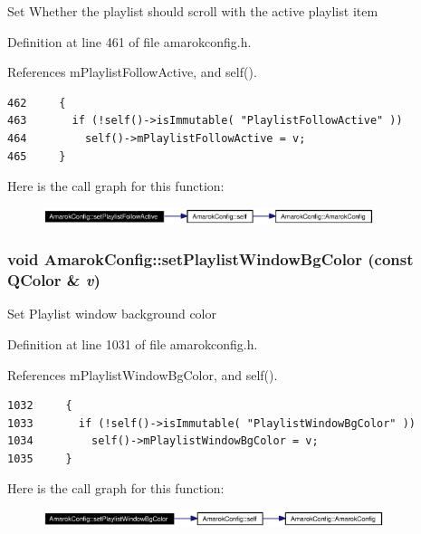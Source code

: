 Set Whether the playlist should scroll with the active playlist item 

Definition at line 461 of file amarokconfig.h.

References m\-Playlist\-Follow\-Active, and self().



\footnotesize\begin{verbatim}462     {
463       if (!self()->isImmutable( "PlaylistFollowActive" ))
464         self()->mPlaylistFollowActive = v;
465     }
\end{verbatim}\normalsize 


Here is the call graph for this function:\begin{figure}[H]
\begin{center}
\leavevmode
\includegraphics[width=274pt]{classAmarokConfig_AmarokConfige47_cgraph}
\end{center}
\end{figure}
\subsubsection{\setlength{\rightskip}{0pt plus 5cm}void Amarok\-Config::set\-Playlist\-Window\-Bg\-Color (const QColor \& {\em v})\hspace{0.3cm}{\tt  [inline, static]}}\label{classAmarokConfig_AmarokConfige107}


Set Playlist window background color 

Definition at line 1031 of file amarokconfig.h.

References m\-Playlist\-Window\-Bg\-Color, and self().



\footnotesize\begin{verbatim}1032     {
1033       if (!self()->isImmutable( "PlaylistWindowBgColor" ))
1034         self()->mPlaylistWindowBgColor = v;
1035     }
\end{verbatim}\normalsize 


Here is the call graph for this function:\begin{figure}[H]
\begin{center}
\leavevmode
\includegraphics[width=282pt]{classAmarokConfig_AmarokConfige107_cgraph}
\end{center}
\end{figure}

